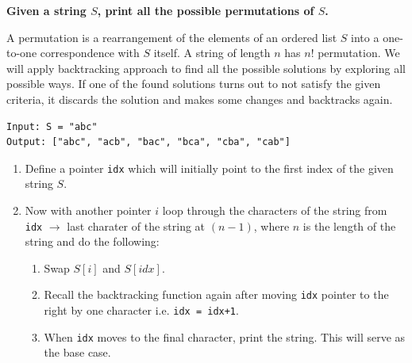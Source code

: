 \documentclass[a4paper,11pt]{book}
\begin{document}
\textbf{Given a string $S$, print all the possible permutations of $S$.}
\vspace{5mm}

\noindent A permutation is a rearrangement of the elements of an ordered list $S$ into a one-to-one correspondence with $S$ itself. A string of length $n$ has $n!$ permutation. We will apply backtracking approach to find all the possible solutions by exploring all possible ways. If one of the found solutions turns out to not satisfy the given criteria, it discards the solution and makes some changes and backtracks again.

\begin{lstlisting}
Input: S = "abc"
Output: ["abc", "acb", "bac", "bca", "cba", "cab"]
\end{lstlisting}

\begin{enumerate}
\item Define a pointer \lstinline{idx} which will initially point to the first index of the given string $S$.
\item Now with another pointer $i$ loop through the characters of the string from \lstinline{idx} $\rightarrow$ last charater of the string at $(n-1)$, where $n$ is the length of the string and do the following:
\begin{enumerate}
    \item Swap $S[i]$ and $S[idx]$.
    \item Recall the backtracking function again after moving \lstinline{idx} pointer to the right by one character i.e. \lstinline{idx = idx+1}.
\item When \lstinline{idx} moves to the final character, print the string. This will serve as the base case.
\end{enumerate}
\end{enumerate}
\end{document}
